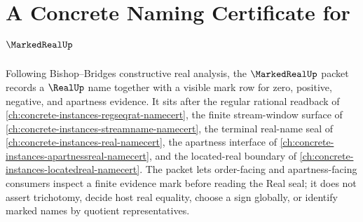 \chapter{A Concrete Naming Certificate for $\MarkedRealUp$}
\label{ch:concrete-instances-marked-real-namecert}

Following Bishop--Bridges constructive real analysis, the $\MarkedRealUp$ packet records a $\RealUp$ name together with a visible mark row for zero, positive, negative, and apartness evidence. It sits after the regular rational readback of \autoref{ch:concrete-instances-regseqrat-namecert}, the finite stream-window surface of \autoref{ch:concrete-instances-streamname-namecert}, the terminal real-name seal of \autoref{ch:concrete-instances-real-namecert}, the apartness interface of \autoref{ch:concrete-instances-apartnessreal-namecert}, and the located-real boundary of \autoref{ch:concrete-instances-locatedreal-namecert}. The packet lets order-facing and apartness-facing consumers inspect a finite evidence mark before reading the Real seal; it does not assert trichotomy, decide host real equality, choose a sign globally, or identify marked names by quotient representatives.

